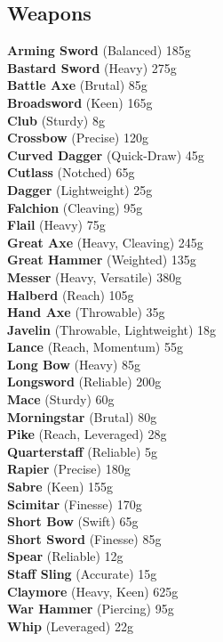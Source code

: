 \documentclass[10pt,twoside]{article}
\begin{document}
\newpage

\subsection{Weapons}

\begin{multicols}{3}
\small
\textbf{Arming Sword} (Balanced) \dotfill 185g \\
\textbf{Bastard Sword} (Heavy) \dotfill 275g \\
\textbf{Battle Axe} (Brutal) \dotfill 85g \\
\textbf{Broadsword} (Keen) \dotfill 165g \\
\textbf{Club} (Sturdy) \dotfill 8g \\
\textbf{Crossbow} (Precise) \dotfill 120g \\
\textbf{Curved Dagger} (Quick-Draw) \dotfill 45g \\
\textbf{Cutlass} (Notched) \dotfill 65g \\
\textbf{Dagger} (Lightweight) \dotfill 25g \\
\textbf{Falchion} (Cleaving) \dotfill 95g \\
\textbf{Flail} (Heavy) \dotfill 75g \\
\textbf{Great Axe} (Heavy, Cleaving) \dotfill 245g \\
\textbf{Great Hammer} (Weighted) \dotfill 135g \\
\textbf{Messer} (Heavy, Versatile) \dotfill 380g \\
\textbf{Halberd} (Reach) \dotfill 105g \\
\textbf{Hand Axe} (Throwable) \dotfill 35g \\
\textbf{Javelin} (Throwable, Lightweight) \dotfill 18g \\
\textbf{Lance} (Reach, Momentum) \dotfill 55g \\
\textbf{Long Bow} (Heavy) \dotfill 85g \\
\textbf{Longsword} (Reliable) \dotfill 200g \\
\textbf{Mace} (Sturdy) \dotfill 60g \\
\textbf{Morningstar} (Brutal) \dotfill 80g \\
\textbf{Pike} (Reach, Leveraged) \dotfill 28g \\
\textbf{Quarterstaff} (Reliable) \dotfill 5g \\
\textbf{Rapier} (Precise) \dotfill 180g \\
\textbf{Sabre} (Keen) \dotfill 155g \\
\textbf{Scimitar} (Finesse) \dotfill 170g \\
\textbf{Short Bow} (Swift) \dotfill 65g \\
\textbf{Short Sword} (Finesse) \dotfill 85g \\
\textbf{Spear} (Reliable) \dotfill 12g \\
\textbf{Staff Sling} (Accurate) \dotfill 15g \\
\textbf{Claymore} (Heavy, Keen) \dotfill 625g \\
\textbf{War Hammer} (Piercing) \dotfill 95g \\
\textbf{Whip} (Leveraged) \dotfill 22g \\
\end{multicols}
\end{document}
